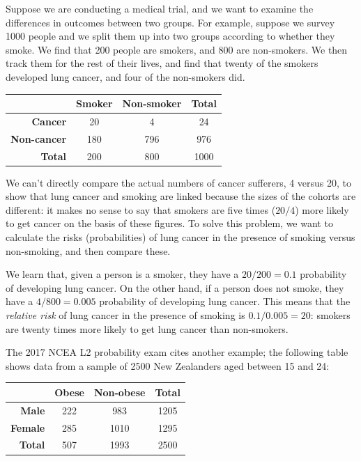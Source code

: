 Suppose we are conducting a medical trial, and we want to examine the differences in outcomes between two groups. For example,
suppose we survey 1000 people and we split them up into two groups according to whether they smoke. We find that 200 people
are smokers, and 800 are non-smokers. We then track them for the rest of their lives, and find that twenty of the smokers
developed lung cancer, and four of the non-smokers did.

\begin{tabular}{|r|c|c|c|}\hline
  & \textbf{Smoker} & \textbf{Non-smoker} & \textbf{Total}\\\hline
  \textbf{Cancer} &20&4&24\\\hline
  \textbf{Non-cancer} &180& 796 & 976 \\\hline
  \textbf{Total} &200&800&1000\\\hline
\end{tabular}

We can't directly compare the actual numbers of cancer sufferers, 4 versus 20, to show that lung cancer and smoking are linked
because the sizes of the cohorts are different: it makes no sense to say that smokers are five times ($ 20/4$) more likely to get cancer
on the basis of these figures. To solve this problem, we want to calculate the risks (probabilities) of lung cancer in the presence
of smoking versus non-smoking, and then compare these.

We learn that, given a person is a smoker, they have a $ 20/200 = 0.1 $ probability of developing
lung cancer. On the other hand, if a person does not smoke, they have a $ 4/800 = 0.005 $ probability
of developing lung cancer. This means that the \emph{relative risk} of lung cancer in the presence
of smoking is $ 0.1/0.005 = 20 $: smokers are twenty times more likely to get lung cancer than non-smokers.

The 2017 NCEA L2 probability exam cites another example; the following table shows data from a sample
of 2500 New Zealanders aged between 15 and 24:

\begin{tabular}{|r|c|c|c|}\hline
  & \textbf{Obese} & \textbf{Non-obese} & \textbf{Total}\\\hline
  \textbf{Male} &222&983&1205\\\hline
  \textbf{Female} &285& 1010 & 1295 \\\hline
  \textbf{Total} &507&1993&2500\\\hline
\end{tabular}

